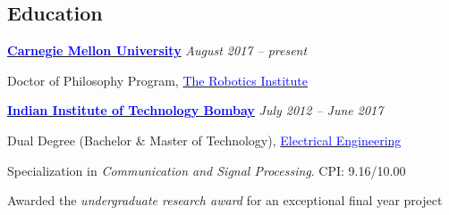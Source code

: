 \documentclass[margin,line]{res}
\newenvironment{list1}{
  \begin{list}{\ding{113}}{%
      \setlength{\itemsep}{0in}
      \setlength{\parsep}{0in} \setlength{\parskip}{0in}
      \setlength{\topsep}{0in} \setlength{\partopsep}{0in} 
      \setlength{\leftmargin}{0.17in}}}{\end{list}}
\begin{document}
\begin{resume}
\section{\sc Education}
{\bf \href{http://www.cmu.edu/}{\textcolor{blue}{Carnegie Mellon University}}} \hfill {\it August 2017 -- present} \\
\vspace*{-.15in}
\begin{list1}
\item[] Doctor of Philosophy Program, \href{http://www.ri.cmu.edu/}{\textcolor{blue}{The Robotics Institute}}
\end{list1}
\vspace*{-.1in}
{\bf \href{http://www.iitb.ac.in/}{\textcolor{blue}{Indian Institute of Technology Bombay}}} \hfill {\it July 2012 -- June 2017} \\
\vspace*{-.15in}
\begin{list1}
\item[] Dual Degree (Bachelor \& Master of Technology), \href{http://www.ee.iitb.ac.in/}{\textcolor{blue}{Electrical Engineering}} 
\item[] Specialization in \textit{Communication and Signal Processing}. CPI: 9.16/10.00
\item[] Awarded the \textit{undergraduate research award} for an exceptional final year project
\end{list1}

\vspace*{-0.13in}


\end{resume}
\end{document}
